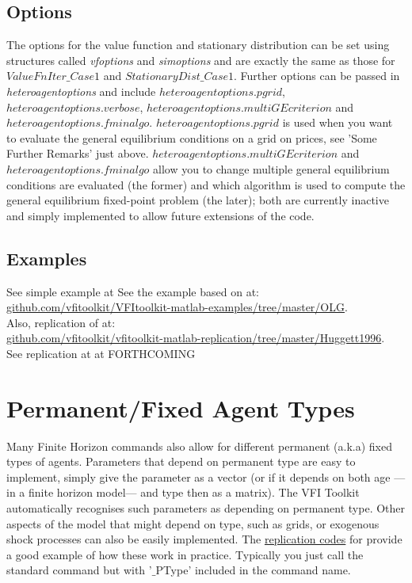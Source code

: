 \subsection{Options}
The options for the value function and stationary distribution can be set using structures called \textit{vfoptions}
and \textit{simoptions} and are exactly the same as those for $ValueFnIter\_{}Case1$ and $StationaryDist\_{}Case1$.
Further options can be passed in \textit{heteroagentoptions} and include $heteroagentoptions.pgrid$, \\
$heteroagentoptions.verbose$, $heteroagentoptions.multiGEcriterion$ and $heteroagentoptions.fminalgo$.
$heteroagentoptions.pgrid$ is used when you want to evaluate the general equilibrium conditions on a grid on prices, see
'Some Further Remarks' just above. $heteroagentoptions.multiGEcriterion$ and $heteroagentoptions.fminalgo$
allow you to change multiple general equilibrium conditions are evaluated (the former) and which algorithm is used
to compute the general equilibrium fixed-point problem (the later); both are currently inactive and simply implemented
to allow future extensions of the code.

\subsection{Examples}
See simple example at
See the example based on \cite*{Huggett1996} at: \\
\href{https://github.com/vfitoolkit/VFItoolkit-matlab-examples/tree/master/OLG}{github.com/vfitoolkit/VFItoolkit-matlab-examples/tree/master/OLG}. \\
Also, replication of \cite*{Huggett1996} at: \\
\href{https://github.com/vfitoolkit/vfitoolkit-matlab-replication/tree/master/Huggett1996}{github.com/vfitoolkit/vfitoolkit-matlab-replication/tree/master/Huggett1996}. \\
See replication at \cite*{HuggettVentura2000} at FORTHCOMING \\

\newpage
\section{Permanent/Fixed Agent Types}
Many Finite Horizon commands also allow for different permanent (a.k.a) fixed types of agents. Parameters that depend on permanent type are easy to implement, simply give the parameter as a vector (or if it depends on both age ---in a finite
horizon model--- and type then as a matrix). The VFI Toolkit automatically recognises such parameters as depending on permanent type. Other aspects of the model that might depend on type, such as grids, or exogenous shock processes can also be easily implemented. The \href{https://github.com/vfitoolkit/vfitoolkit-matlab-replication/tree/master/HubbardSkinnerZeldes1994}{replication codes} for \cite*{HubbardSkinnerZeldes1994} provide a good example of how these work in practice. Typically you just call the standard command but with '$\_{}$PType' included in the command name.

